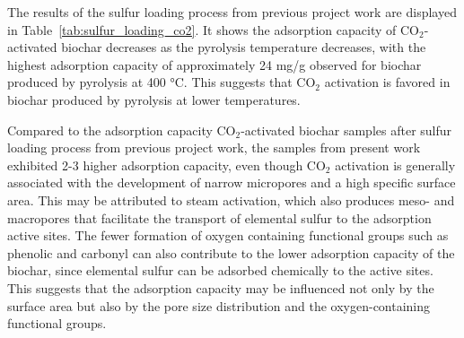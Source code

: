 
The results of the sulfur loading process from previous project work are displayed in Table~\ref{tab:sulfur_loading_co2}. It shows the adsorption capacity of CO$_2$-activated biochar decreases as the pyrolysis temperature decreases, with the highest adsorption capacity of approximately 24 mg/g observed for biochar produced by pyrolysis at 400 °C. This suggests that CO$_2$ activation is favored in biochar produced by pyrolysis at lower temperatures.

\vspace{0.3em}

Compared to the adsorption capacity CO$_2$-activated biochar samples after sulfur loading process from previous project work, the samples from present work exhibited 2-3 higher adsorption capacity, even though CO$_2$ activation is generally associated with the development of narrow micropores and a high specific surface area. This may be attributed to steam activation, which also produces meso- and macropores that facilitate the transport of elemental sulfur to the adsorption active sites. The fewer formation of oxygen containing functional groups such as phenolic and carbonyl can also contribute to the lower adsorption capacity of the biochar, since elemental sulfur can be adsorbed chemically to the active sites. This suggests that the adsorption capacity may be influenced not only by the surface area but also by the pore size distribution and the oxygen-containing functional groups.



